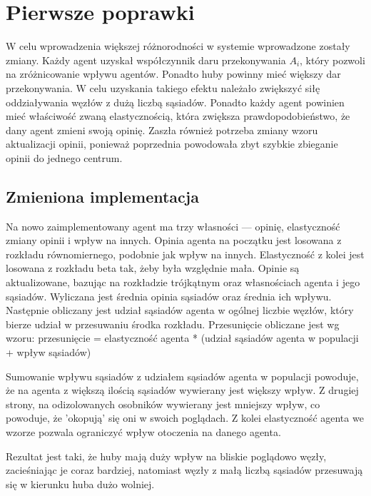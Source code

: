 \section{Pierwsze poprawki}

W celu wprowadzenia większej różnorodności w systemie wprowadzone zostały zmiany. Każdy agent uzyskał współczynnik daru przekonywania $A_i$, który pozwoli na zróżnicowanie wpływu agentów.
Ponadto huby powinny mieć większy dar przekonywania. W celu uzyskania takiego efektu należało zwiększyć siłę oddziaływania węzłów z dużą liczbą sąsiadów.
Ponadto każdy agent powinien mieć właściwość zwaną elastycznością, która zwiększa prawdopodobieństwo, że dany agent zmieni swoją opinię.
Zaszła również potrzeba zmiany wzoru aktualizacji opinii, ponieważ poprzednia powodowała zbyt szybkie zbieganie opinii do jednego centrum.

\subsection{Zmieniona implementacja}

Na nowo zaimplementowany agent ma trzy własności — opinię, elastyczność zmiany opinii i wpływ na innych.
Opinia agenta na początku jest losowana z rozkładu równomiernego, podobnie jak wpływ na innych.
Elastyczność z kolei jest losowana z rozkładu beta tak, żeby była względnie mała.
Opinie są aktualizowane, bazując na rozkładzie trójkątnym oraz własnościach agenta i jego sąsiadów.
Wyliczana jest średnia opinia sąsiadów oraz średnia ich wpływu.
Następnie obliczany jest udział sąsiadów agenta w ogólnej liczbie węzłów, który bierze udział w przesuwaniu środka rozkładu.
Przesunięcie obliczane jest wg wzoru:
przesunięcie = elastyczność agenta * (udział sąsiadów agenta w populacji + wpływ sąsiadów)

Sumowanie wpływu sąsiadów z udziałem sąsiadów agenta w populacji powoduje, że na agenta z większą ilością sąsiadów wywierany jest większy wpływ.
Z drugiej strony, na odizolowanych osobników wywierany jest mniejszy wpływ, co powoduje, że 'okopują' się oni w swoich poglądach.
Z kolei elastyczność agenta we wzorze pozwala ograniczyć wpływ otoczenia na danego agenta.

Rezultat jest taki, że huby mają duży wpływ na bliskie poglądowo węzły, zacieśniając je coraz bardziej, natomiast węzły z małą liczbą sąsiadów przesuwają się w kierunku huba dużo wolniej.
